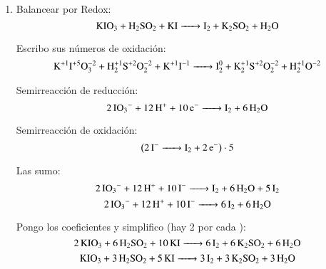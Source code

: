 \begin{enumerate}
\item Balancear por Redox:
$$\ce{KIO3 + H2SO2 + KI ->
I2 + K2SO2 + H2O}$$

Escribo sus números de oxidación:
$$\ce{K^{+1}I^{+5}O^{-2}3 + H^{+1}2S^{+2}O^{-2}2 + K^{+1}I^{-1} ->
I^{0}2 + K^{+1}2S^{+2}O^{-2}2 + H^{+1}2O^{-2}}$$


\begin{multicols}{2}
    Semirreacción de reducción:
    $$\ce{
    2IO3^- + 12H^+ + 10e^- ->
    I2 + 6H2O
    }$$
    
    Semirreacción de oxidación:
    $$\left(\ce{
    2I^- ->
    I2 + 2e^-
    }\right) \cdot 5$$
\end{multicols}

Las sumo:
$$\ce{ 2IO3^- + 12H^+ + 10I^- ->
I2 + 6H2O + 5I2 }$$
$$\ce{ 2IO3^- + 12H^+ + 10I^- ->
6I2 + 6H2O }$$

Pongo los coeficientes y simplifico (hay 2  por cada ):
$$\ce{ 2KIO3 + 6H2SO2 + 10KI ->
6I2 + 6K2SO2 + 6H2O}$$
$$\ce{ KIO3 + 3H2SO2 + 5KI ->
3I2 + 3K2SO2 + 3H2O}$$
\end{enumerate}